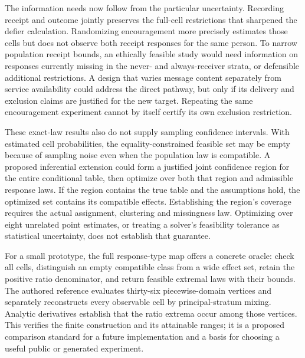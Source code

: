 The information needs now follow from the particular uncertainty.
Recording receipt and outcome jointly preserves the full-cell restrictions
that sharpened the defier calculation. Randomizing encouragement more
precisely estimates those cells but does not observe both receipt
responses for the same person. To narrow population receipt bounds, an
ethically feasible study would need information on responses currently
missing in the never- and always-receiver strata, or defensible additional
restrictions. A design that varies message content separately from service
availability could address the direct pathway, but only if its delivery
and exclusion claims are justified for the new target. Repeating the
same encouragement experiment cannot by itself certify its own exclusion
restriction.

These exact-law results also do not supply sampling confidence intervals.
With estimated cell probabilities, the equality-constrained feasible set
may be empty because of sampling noise even when the population law is
compatible. A proposed inferential extension could form a justified joint
confidence region for the entire conditional table, then optimize over
both that region and admissible response laws. If the region contains
the true table and the assumptions hold, the optimized set contains its
compatible effects. Establishing the region's coverage requires the actual
assignment, clustering and missingness law. Optimizing over eight unrelated
point estimates, or treating a solver's feasibility tolerance as statistical
uncertainty, does not establish that guarantee.

For a small prototype, the full response-type map offers a concrete oracle:
check all cells, distinguish an empty compatible class from a wide effect
set, retain the positive ratio denominator, and return feasible extremal
laws with their bounds. The authored reference evaluates thirty-six
piecewise-domain vertices and separately reconstructs every observable
cell by principal-stratum mixing. Analytic derivatives establish that
the ratio extrema occur among those vertices. This verifies the finite
construction and its attainable ranges; it is a proposed comparison
standard for a future implementation and a basis for choosing a useful
public or generated experiment.\citep{exec17_s3_sensitivity}
\label{exec17:s3-sensitivity-end}
